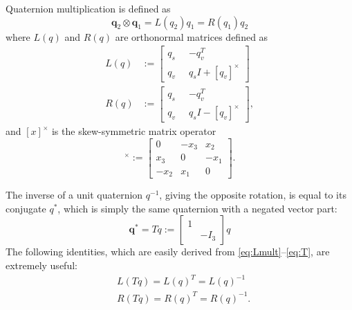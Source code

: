 \documentclass[letterpaper, 10 pt, conference]{ieeeconf}  %
\newcommand{\skewmat}[1]{[#1]^\times}
\newcommand{\q}{\textbf{q}}
\begin{document}
        Quaternion multiplication is defined as
        \begin{equation} \label{eq:quat_mult}
            \q_2 \otimes \q_1 = L(q_2) q_1 = R(q_1) q_2
        \end{equation}
        where $L(q)$ and $R(q)$ are orthonormal matrices defined as
        \begin{align}
            L(q) &:= \begin{bmatrix} 
                q_s \;\; & -q_v^T \\ 
                q_v \;\; & q_s I + \skewmat{q_v} 
            \end{bmatrix} 
            \label{eq:Lmult} \\
            R(q) &:=\begin{bmatrix} 
                q_s \;\; & -q_v^T \\ 
                q_v \;\; & q_s I - \skewmat{q_v} 
            \end{bmatrix} \label{eq:Rmult},
        \end{align}
        and $\skewmat{x}$ is the skew-symmetric matrix operator
        \begin{equation}
            \skewmat{x} := \begin{bmatrix} 
                0 & -x_3 & x_2 \\ 
                x_3 & 0 & -x_1\\ 
                -x_2 & x_1 & 0 
            \end{bmatrix}.
        \end{equation}
        
        The inverse of a unit quaternion $q^{-1}$, giving the opposite rotation, is equal 
        to its conjugate $q^*$, which is simply the same quaternion with a negated vector 
        part:
        \begin{equation} \label{eq:T}
            \q^* = T q := \begin{bmatrix} 
                1 & \\ 
                & -I_3 
            \end{bmatrix} q
        \end{equation}
        The following identities, which are easily derived from 
        \eqref{eq:Lmult}--\eqref{eq:T}, are extremely useful:
        \begin{align}
            &L(Tq) = L(q)^T = L(q)^{-1} \\
            &R(Tq) = R(q)^T = R(q)^{-1} .
        \end{align}
        
\end{document}
